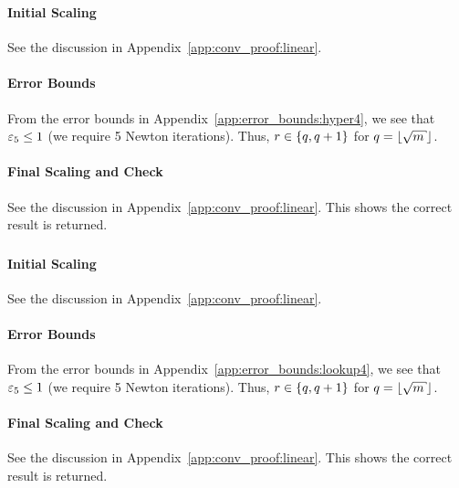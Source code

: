 \subsubsection{\HyperFour{}}
\label{app:conv_proof:hyper4}

\paragraph{Initial Scaling}
See the discussion in Appendix~\ref{app:conv_proof:linear}.

\paragraph{Error Bounds}
From the error bounds in Appendix~\ref{app:error_bounds:hyper4},
we see that $\varepsilon_{5}\le1$ (we require 5 Newton iterations).
Thus, $r\in\left\{ q,q+1 \right\}$ for $q = \floor{\sqrt{m}}$.

\paragraph{Final Scaling and Check}
See the discussion in Appendix~\ref{app:conv_proof:linear}.
This shows the correct result is returned.

\subsubsection{\LookupFour{}}
\label{app:conv_proof:lookup4}

\paragraph{Initial Scaling}
See the discussion in Appendix~\ref{app:conv_proof:linear}.

\paragraph{Error Bounds}
From the error bounds in Appendix~\ref{app:error_bounds:lookup4},
we see that $\varepsilon_{5}\le1$ (we require 5 Newton iterations).
Thus, $r\in\left\{ q,q+1 \right\}$ for $q = \floor{\sqrt{m}}$.

\paragraph{Final Scaling and Check}
See the discussion in Appendix~\ref{app:conv_proof:linear}.
This shows the correct result is returned.

\subsubsection{\LookupEight{}}

